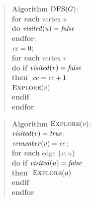 \documentclass[12pt]{article}
\newcommand{\DFS}{\textsf{\sc DFS}}
\newcommand{\EXPLORE}{\textsf{\sc Explore}}
\newcommand{\VISITED}{\mathord{\it visited}}
\newcommand{\TRUE}{\mathord{\it true}}
\newcommand{\FALSE}{\mathord{\it false}}
\newcommand{\CC}{\mathord{\it cc}}
\newcommand{\CCN}{\mathord{\it ccnumber}}
\begin{document}
\newpage

\begin{quote}
\begin{tabbing}
{\bf Algorithm} $\DFS(G)$: \\
{\bf for each} vertex $u$ \\
{\bf do} $\VISITED(u) = \FALSE$ \\
{\bf endfor}; \\
$\CC = 0$; \\ 
{\bf for each} vertex $v$ \\
{\bf do} \= {\bf if} $\VISITED(v) = \FALSE$ \\
         \> {\bf then} \= $\CC = \CC + 1$ \\ 
         \>            \> $\EXPLORE(v)$  \\
         \> {\bf endif} \\
{\bf endfor} \\
\end{tabbing}
\end{quote}

\begin{quote}
\begin{tabbing}
{\bf Algorithm} $\EXPLORE(v)$: \\
$\VISITED(v) = \TRUE$; \\
$\CCN(v) = \CC$; \\ 
{\bf for each} edge $\{v,u\}$ \\
{\bf do} \= {\bf if} $\VISITED(u) = \FALSE$ \\
         \> {\bf then} \= $\EXPLORE(u)$ \\
         \> {\bf endif} \\
{\bf endfor} \\
\end{tabbing}
\end{quote}
\end{document}
